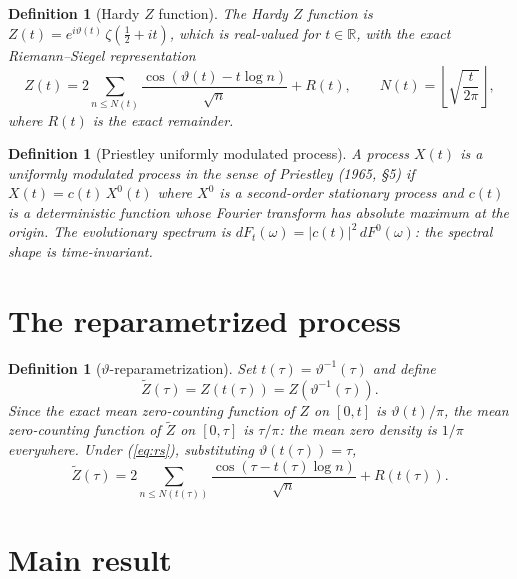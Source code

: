 \documentclass[11pt,a4paper]{article}
\newtheorem{definition}[theorem]{Definition}
\begin{document}
\begin{definition}[Hardy $Z$ function]
\label{def:hardy-z}
The Hardy $Z$ function is $Z(t)=e^{i\vartheta(t)}\,\zeta(\tfrac{1}{2}+it)$,
which is real-valued for $t\in\mathbb{R}$, with the exact Riemann--Siegel representation
\begin{equation}
\label{eq:rs}
Z(t) = 2\sum_{n \le N(t)} \frac{\cos(\vartheta(t)-t\log n)}{\sqrt{n}} + R(t),
\qquad N(t)=\left\lfloor\sqrt{\frac{t}{2\pi}}\right\rfloor,
\end{equation}
where $R(t)$ is the exact remainder.
\end{definition}

\begin{definition}[Priestley uniformly modulated process]
\label{def:priestley}
A process $X(t)$ is a \emph{uniformly modulated process} in the sense of
Priestley (1965, \S5) if $X(t)=c(t)\,X^0(t)$ where $X^0$ is a second-order
stationary process and $c(t)$ is a deterministic function whose Fourier
transform has absolute maximum at the origin. The evolutionary spectrum is
$dF_t(\omega)=|c(t)|^2\,dF^0(\omega)$: the spectral shape is time-invariant.
\end{definition}

\section{The reparametrized process}

\begin{definition}[$\vartheta$-reparametrization]
\label{def:reparam}
Set $t(\tau)=\vartheta^{-1}(\tau)$ and define
\begin{equation}
\label{eq:ztilde}
\widetilde{Z}(\tau) = Z(t(\tau)) = Z(\vartheta^{-1}(\tau)).
\end{equation}
Since the exact mean zero-counting function of $Z$ on $[0,t]$ is
$\vartheta(t)/\pi$, the mean zero-counting function of $\widetilde{Z}$
on $[0,\tau]$ is $\tau/\pi$: the mean zero density is $1/\pi$ everywhere.
Under (\ref{eq:rs}), substituting $\vartheta(t(\tau))=\tau$,
\begin{equation}
\label{eq:ztilde-rs}
\widetilde{Z}(\tau)
= 2\sum_{n \le N(t(\tau))} \frac{\cos(\tau - t(\tau)\log n)}{\sqrt{n}} + R(t(\tau)).
\end{equation}
\end{definition}

\section{Main result}
\end{document}
